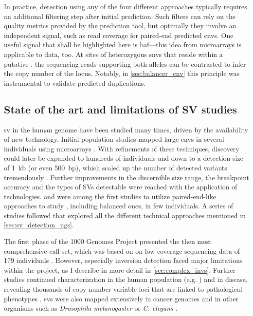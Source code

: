In practice, \sv detection using any of the four different approaches typically
requires an additional filtering step after initial \sv prediction. Such
filters can rely on the quality metrics provided by the prediction tool, but
optimally they involve an independent signal, such as read coverage for
paired-end predicted \acp{cnv}. One useful signal that shall be highlighted here
is \acl{baf}---this idea from microarrays is applicable to \mps data,
too. At sites of heterozygous \acp{snv} that reside within a putative \sv, the
sequencing reads supporting both alleles can be contrasted to infer the copy
number of the locus. Notably, in \cref{sec:balancer_cnv} this principle was instrumental
to validate predicted duplications.





\subsection{State of the art and limitations of SV studies}
\label{sec:limitations}

\Acl{sv} in the human genome have been studied many times, driven by the
availability of new technology. Initial population studies mapped large \acp{cnv}
in several individuals using microarrays \citep{Sebat2004,Iafrate2004,Sharp2005,Redon2006}.
With refinements of these techniques, \cnv discovery could later be expanded to
hundreds of individuals and down to a detection size of 1~kb (or even 500~bp),
which scaled up the number of detected variants tremendously
\citep{McCarroll2008,Conrad2010}. Further improvements in the discernible size
range, the breakpoint accuracy and the types of SVs detectable were reached
with the application of \mps technologies. \cite{Korbel2007} and \cite{Kidd2008}
were among the first studies to utilize paired-end-like approaches to study
\citep{sv}, including balanced ones, in few individuals. A series of studies
followed that explored all the different technical approaches mentioned in
\cref{sec:sv_detection_ngs}.

The first phase of the 1000 Genomes Project presented the then most
comprehensive \sv call set, which was based on on low-coverage sequencing data
of 179 individuals \citep{Mills2011}. However, especially inversion detection
faced major limitations within the project, as I describe in more detail in
\cref{sec:complex_invs}. Further studies continued \sv characterization in the
human population (e.g. \citep{Sudmant2015a,Hehir-Kwa2016}) and in disease,
revealing thousands of copy number variable loci that are linked to pathological
phenotypes \citep{Swaminathan2012,Forbes2011}. \Acp{sv} were also mapped extensively in
cancer genomes \citep{Weischenfeldt2016,Campbell2017} and in other organisms such
as \textit{Drosophila melanogaster} \citep{Massouras2012,Zichner2013} or
\textit{C. elegans} \citep{Maydan2010}.

